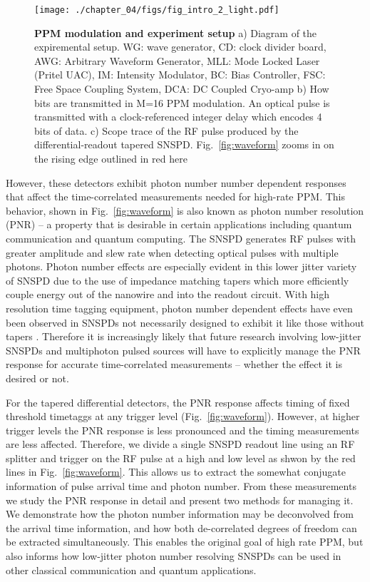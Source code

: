 \documentclass[11pt]{caltech_thesis} %
\begin{document}
\hypertarget{fig:intro}{%
\begin{figure}
\centering
\texttt{[image: ./chapter\_04/figs/fig\_intro\_2\_light.pdf]}
\caption[{PPM modulation and experiment setup}]{\textbf{PPM modulation and experiment setup} a) Diagram of the expiremental setup. WG: wave generator, CD: clock divider board, AWG: Arbitrary Waveform Generator, MLL: Mode Locked Laser (Pritel UAC), IM: Intensity Modulator, BC: Bias Controller, FSC: Free Space Coupling System, DCA: DC Coupled Cryo-amp b) How bits are transmitted in M=16 PPM modulation. An optical pulse is transmitted with a clock-referenced integer delay which encodes 4 bits of data. c) Scope trace of the RF pulse produced by the differential-readout tapered SNSPD. Fig.~\ref{fig:waveform} zooms in on the rising edge outlined in red here}
\label{fig:intro}
\end{figure}
}

However, these detectors exhibit photon number number dependent responses that affect the time-correlated measurements needed for high-rate PPM. This behavior, shown in Fig.~\ref{fig:waveform} is also known as photon number resolution (PNR) -- a property that is desirable in certain applications including quantum communication and quantum computing. The SNSPD generates RF pulses with greater amplitude and slew rate when detecting optical pulses with multiple photons. Photon number effects are especially evident in this lower jitter variety of SNSPD due to the use of impedance matching tapers which more efficiently couple energy out of the nanowire and into the readout circuit. With high resolution time tagging equipment, photon number dependent effects have even been observed in SNSPDs not necessarily designed to exhibit it \autocite{schapeler2023superconducting,sauer2023resolving} like those without tapers \autocite{Cahall2017SlewRatePNR}. Therefore it is increasingly likely that future research involving low-jitter SNSPDs and multiphoton pulsed sources will have to explicitly manage the PNR response for accurate time-correlated measurements -- whether the effect it is desired or not.

For the tapered differential detectors, the PNR response affects timing of fixed threshold timetaggs at any trigger level (Fig.~\ref{fig:waveform}). However, at higher trigger levels the PNR response is less pronounced and the timing measurements are less affected. Therefore, we divide a single SNSPD readout line using an RF splitter and trigger on the RF pulse at a high and low level as shwon by the red lines in Fig.~\ref{fig:waveform}. This allows us to extract the somewhat conjugate information of pulse arrival time and photon number. From these measurements we study the PNR response in detail and present two methods for managing it. We demonstrate how the photon number information may be deconvolved from the arrival time information, and how both de-correlated degrees of freedom can be extracted simultaneously. This enables the original goal of high rate PPM, but also informs how low-jitter photon number resolving SNSPDs can be used in other classical communication and quantum applications.
\end{document}
